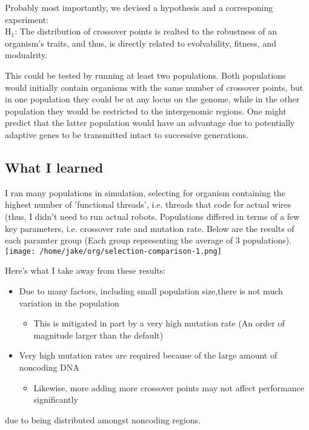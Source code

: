 \documentclass[a4paper]{article}
\begin{document}
Probably most importantly, we devised a hypothesis and a corresponing experiment:\\

\hangindent =0.7cm H$_{\text{1}}$: The distribution of crossover points is realted to the robustness of an organism's traits, and thus, is directly related to evolvability, fitness, and modualrity.\\
\vspace 

This could be tested by running at least two populations. Both populations would initially contain organisms with the same number of crossover points, but in one population they could be at any locus on the genome, while in the other population they would be restricted to the
 intergenomic regions. One might predict that the latter population would have an advantage due to potentially adaptive genes to be transmitted intact to successive generations.\\

\subsection{What I learned}
\label{sec-2-1}
I ran many populations in simulation, selecting for organism containing the highest number of
'functional threads', i.e. threads that code for actual wires (thus, I didn't need to run actual robots.
Populations differed in terms of a few key parameters, i.e. crossover rate and mutation rate. 
Below are the results of each paramter group (Each group representing the average of 3 populations).\\


\texttt{[image: /home/jake/org/selection-comparison-1.png]}

Here's what I take away from these results:
\begin{itemize}
\item Due to many factors, including small population size,there is not
much variation in the population
\begin{itemize}
\item This is mitigated in part by a very high mutation rate (An order of magnitude larger than the default)
\end{itemize}
\item Very high mutation rates are required because of the large amount of noncoding DNA
\begin{itemize}
\item Likewise, more adding more crossover points may not affect performance significantly
\end{itemize}
\end{itemize}
due to being distributed amongst noncoding regions.
\end{document}
